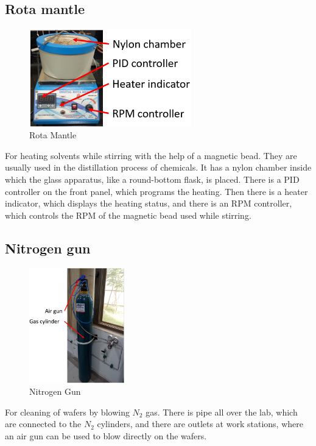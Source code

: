 \documentclass[12pt,a4paper,bold]{thesis}
\theoremstyle{thm}
\theoremstyle{definition}
\begin{document}
\subsection{Rota mantle}

\begin{figure}[H]
	\centering
   \includegraphics[width=7cm]{Images/9.png} 
   \caption{Rota Mantle}
\end{figure}
\indent\indent\indent For heating solvents while stirring with the help of a magnetic bead. They are usually used in the distillation process of chemicals. It has a nylon chamber inside which the glass apparatus, like a round-bottom flask, is placed. There is a PID controller on the front panel, which programs the heating. Then there is a heater indicator, which displays the heating status, and there is an RPM controller, which controls the RPM of the magnetic bead used while stirring. 

\subsection{Nitrogen gun}
\begin{figure}[H]
	\centering
   \includegraphics[height=5cm]{Images/10.png} 
   \caption{Nitrogen Gun}
\end{figure}
\indent\indent\indent For cleaning of wafers by blowing $N_2$ gas. There is pipe all over the lab, which are connected to the $N_2$ cylinders, and there are outlets at work stations, where an air gun can be used to blow directly on the wafers.
\end{document}
